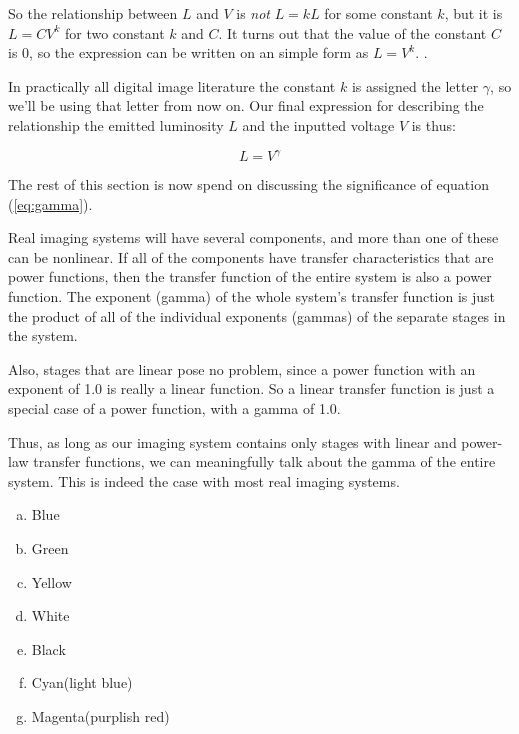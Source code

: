 So the relationship between $L$ and $V$ is \textit{not} $L = kL$ for
some constant $k$, but it is $L = CV^k$ for two constant $k$ and
$C$. It turns out that the value of the constant $C$ is $0$, so the
expression can be written on an simple form as $L =
V^k$. \cite{motta1991analytical_crt,Pascale2003_ReviewRGBColourSpaces,boutel:_png_portab_networ_graph_specif_version1,boutel:_png_portab_networ_graph_specif_version11,boutel:_png_portab_networ_graph_specif_version12,roelofs99:_png}.

In practically all digital image literature the constant $k$ is
assigned the letter $\gamma$, so we'll be using that letter from now
on. Our final expression for describing the relationship the emitted
luminosity $L$ and the inputted voltage $V$ is thus:

\begin{equation}
  \label{eq:gamma}
  L = V^\gamma
\end{equation}

The rest of this section is now spend on discussing the significance
of equation (\ref{eq:gamma}).

Real imaging systems will have several components, and more than one
of these can be nonlinear. If all of the components have transfer
characteristics that are power functions, then the transfer function
of the entire system is also a power function. The exponent (gamma) of
the whole system's transfer function is just the product of all of the
individual exponents (gammas) of the separate stages in the system.

Also, stages that are linear pose no problem, since a power function
with an exponent of 1.0 is really a linear function. So a linear
transfer function is just a special case of a power function, with a
gamma of 1.0.

Thus, as long as our imaging system contains only stages with linear
and power-law transfer functions, we can meaningfully talk about the
gamma of the entire system. This is indeed the case with most real
imaging systems.

\begin{Answer}[ref={rgb-triplet}]
  \begin{enumerate}[(a)]
  \item Blue
  \item Green
  \item Yellow
  \item White
  \item Black
  \item Cyan(light blue)
  \item Magenta(purplish red)
  \end{enumerate}
\end{Answer}

